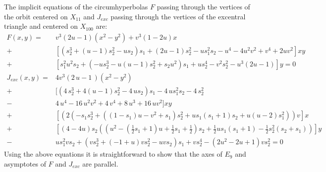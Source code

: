 The implicit equations of the circumhyperbolas $F $ passing through the vertices of the orbit centered on $X_{11}$ and   $J_{exc} $ passing through the vertices of the excentral triangle and centered on $X_{100}$ are:
{\small 
\begin{align*}
F(x,y)=& v^3(2 u  -1) (x^2-y^2)+  v^3(1-2u)x\\
+&[( s_2^3+(u-1) s_2^2-u s_2) s_1+(2u-1)s_2^2-us_1^2s_2 -u^4-4 u^2 v^2+v^4+2 uv^2] x y\\
 +&[ s_1^2 u^2  s_2+(-u  s_2^3-u (u-1)  s_2^2+ s_2 u^2)  s_1+u  s_2^4-v^2  s_2^2-u^3 (2 u-1)]y=0\\
 J_{exc}(x,y)=&  4v^3\left( 2\,u -1\, \right) ({x}^{2}-y^2)\\
 +& [ \left( 4\,s_2^{3}+ 4\left(  u-1
 \right)     s_2 ^{2}-4\,u{   s_2} \right) {   s_1}  -4\,u 
   s_1 ^{2}{   s_2} -4\,    s_2 ^{2} \\
   -&4\,{u}^{4}-16\,{
u}^{2}{v}^{2}+4\,{v}^{4}+8\,{u}^{3}+16\,u{v}^{2}
 ] xy\\
 +&[ (2 (- s_1  s_2^3+( (1- s_1) u-v^2+ s_1)  s_2^2+u  s_1 ( s_1+1)  s_2+u (u-2) s_1^2)) v]x\\
 +&[ (4-4 u) s_2  ((u^2-( \frac{1}{2} s_1 +1) u+ \frac{1}{2} s_1 +\frac{1}{2}) s_2 + \frac{1}{2} u s_1  (s_1 +1)- \frac{1}{2} s_2 ^2 (s_2 +s_1 ))]y\\
   -& u  s_1^2 v  s_2+(v  s_2^3+(-1+u) v  s_2^2-u v  s_2)  s_1+v  s_2^4-(2 u^2-2 u+1) v  s_2^2=0
\end{align*}
}
 Using the above equations it is straightforward to show that the axes of $E_9$ and asymptotes  of $F $ and $J_{exc} $ are parallel.